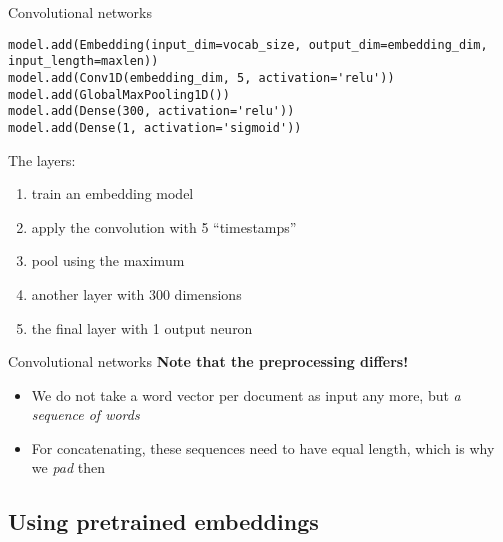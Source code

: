 \begin{frame}[fragile]{Convolutional networks}
\begin{lstlisting}
model.add(Embedding(input_dim=vocab_size, output_dim=embedding_dim, input_length=maxlen))
model.add(Conv1D(embedding_dim, 5, activation='relu'))
model.add(GlobalMaxPooling1D())
model.add(Dense(300, activation='relu'))
model.add(Dense(1, activation='sigmoid'))
\end{lstlisting}	
The layers:	
\begin{enumerate}[<+->]
\item train an embedding model
\item apply the convolution with 5 ``timestamps''
\item pool using the maximum
\item another layer with 300 dimensions
\item the final layer with 1 output neuron
\end{enumerate}
\end{frame}


\begin{frame}{Convolutional networks}
  \textbf{Note that the preprocessing differs!}
  
  \begin{itemize}
  \item We do not take a word vector per document as input any more, but \emph{a sequence of words}
  \item For concatenating, these sequences need to have equal length, which is why we \emph{pad} then
  \end{itemize}
	
\end{frame}






\subsection{Using pretrained embeddings}

